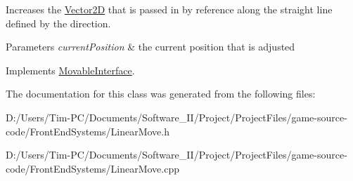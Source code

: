 Increases the \hyperlink{class_vector2_d}{Vector2D} that is passed in by reference along the straight line defined by the direction. 


\begin{DoxyParams}{Parameters}
{\em current\+Position} & the current position that is adjusted \\
\hline
\end{DoxyParams}


Implements \hyperlink{class_movable_interface_a899cc1c78eacbee13b906c6770e7f025}{Movable\+Interface}.



The documentation for this class was generated from the following files\+:\begin{DoxyCompactItemize}
\item 
D\+:/\+Users/\+Tim-\/\+P\+C/\+Documents/\+Software\+\_\+\+I\+I/\+Project/\+Project\+Files/game-\/source-\/code/\+Front\+End\+Systems/Linear\+Move.\+h\item 
D\+:/\+Users/\+Tim-\/\+P\+C/\+Documents/\+Software\+\_\+\+I\+I/\+Project/\+Project\+Files/game-\/source-\/code/\+Front\+End\+Systems/Linear\+Move.\+cpp\end{DoxyCompactItemize}
